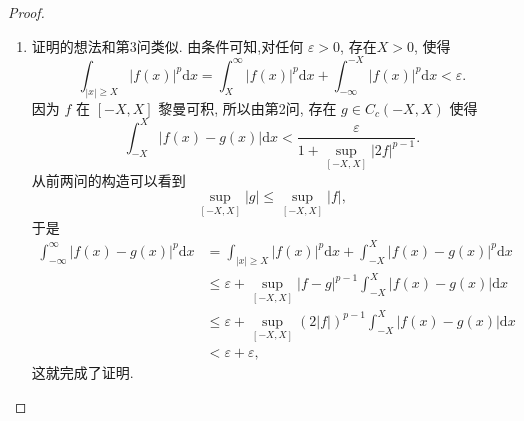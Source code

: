 \documentclass[../../main.tex]{subfiles}%
\begin{document}
\begin{proof}
\begin{enumerate}[(1)]
\item 证明的想法和第3问类似. 由条件可知,对任何 $\varepsilon > 0$, 存在$X > 0$, 使得
\[
\int_{|x| \geqslant X} |f(x)|^{p}\mathrm{d}x=
\int_{X}^{\infty} |f(x)|^{p}\mathrm{d}x + \int_{-\infty}^{-X} |f(x)|^{p}\mathrm{d}x < \varepsilon.
\]
因为 $f$ 在 $[-X,X]$ 黎曼可积, 所以由第2问, 存在 $g \in C_c(-X,X)$ 使得
\[
\int_{-X}^{X} |f(x) - g(x)|\mathrm{d}x < \frac{\varepsilon}{1 + \sup_{[-X,X]} |2f|^{p - 1}}.
\]
从前两问的构造可以看到
\[
\sup_{[-X,X]} |g| \leqslant \sup_{[-X,X]} |f|,
\]
于是
\begin{align*}
\int_{-\infty}^{\infty} |f(x) - g(x)|^{p}\mathrm{d}x &= \int_{|x| \geqslant X} |f(x)|^{p}\mathrm{d}x + \int_{-X}^{X} |f(x) - g(x)|^{p}\mathrm{d}x \\
&\leqslant \varepsilon + \sup_{[-X,X]} |f - g|^{p - 1} \int_{-X}^{X} |f(x) - g(x)|\mathrm{d}x \\
&\leqslant \varepsilon + \sup_{[-X,X]} (2|f|)^{p - 1} \int_{-X}^{X} |f(x) - g(x)|\mathrm{d}x \\
&< \varepsilon + \varepsilon,
\end{align*}
这就完成了证明. 
\end{enumerate}
\end{proof}
\end{document}
